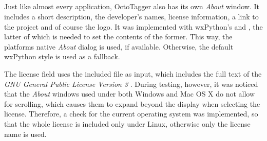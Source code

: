 \subsection{}
\def\kapitelautor{Erik Ritschl}

Just like almost every application, OctoTagger also has its own \emph{About} window. It includes  a short description, the developer's names, license information, a link to the project and of course the logo. 
It was implemented with wxPython's  and , the latter of which is needed to set the contents of the former. This way, the platforms native \emph{About} dialog is used, if available. Otherwise, the default wxPython style is used as a fallback. 

The license field uses the included  file as input, which includes the full text of the \emph{GNU General Public License Version 3} \cite{GPLv3}. 
During testing, however, it was noticed that the \emph{About} windows used under both Windows and Mac OS X do not allow for scrolling, which causes them to expand beyond the display when selecting the license. Therefore, a check for the current operating system was implemented, so that the whole license is included only under Linux, otherwise only the license name is used.